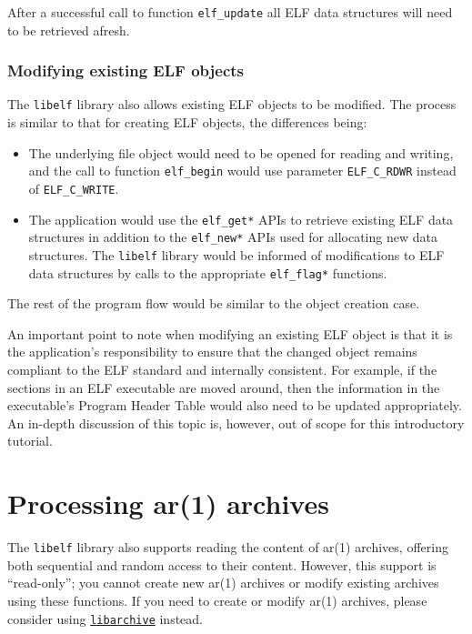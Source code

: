 \documentclass[a4paper,pdftex]{book}
\newcommand{\constant}[1]{\texttt{#1}}
\newcommand{\function}[1]{\texttt{#1}}
\newcommand{\library}[1]{\texttt{#1}}
\begin{document}
After a successful call to function \function{elf\_update} all ELF
data structures will need to be retrieved afresh.%

\subsection{Modifying existing ELF objects}\label{sec.modifying-elf}

The \library{libelf} library also allows existing ELF objects to be
modified.  The process is similar to that for creating ELF objects,
the differences being:%

\begin{itemize}
\item The underlying file object would need to be opened for reading
  and writing, and the call to function \function{elf\_begin} would
  use parameter \constant{ELF\_C\_RDWR} instead of
  \constant{ELF\_C\_WRITE}.
\item The application would use the \function{elf\_get*} APIs to
  retrieve existing ELF data structures in addition to the
  \function{elf\_new*} APIs used for allocating new data structures.
  The \library{libelf} library would be informed of modifications to
  ELF data structures by calls to the appropriate
  \function{elf\_flag*} functions.%
\end{itemize}

The rest of the program flow would be similar to the object creation
case.

An important point to note when modifying an existing ELF object is
that it is the application's responsibility to ensure that the changed
object remains compliant to the ELF standard and internally
consistent.  For example, if the sections in an ELF executable are
moved around, then the information in the executable's Program Header
Table would also need to be updated appropriately.  An in-depth
discussion of this topic is, however, out of scope for this
introductory tutorial.

\chapter{Processing ar(1) archives}\label{chap.ar}

The \library{libelf} library also supports reading the content of
ar(1) archives, offering both sequential and random access to their
content.  However, this support is ``read-only''; you cannot create
new ar(1) archives or modify existing archives using these
functions. If you need to create or modify ar(1) archives, please
consider using
\href{https://github.com/libarchive/libarchive/wiki}{\library{libarchive}}
instead.
\end{document}
